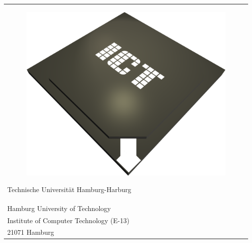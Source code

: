\begin{tabular}{p{\textwidth}}
\begin{figure} %
\centering
\includegraphics[scale=0.25]{figures/ictlogo.png}
\end{figure}
Technische Universität Hamburg-Harburg\\
Hamburg University of Technology\\
Institute of Computer Technology (E-13) \\
21071 Hamburg

\end{tabular}


